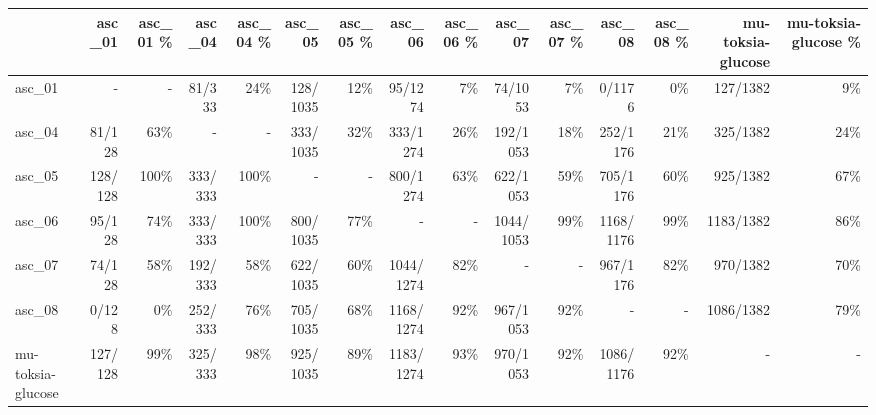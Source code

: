 \begin{tabular}{lrrrrrrrrrrrrrr}
\toprule
 & asc_01 & asc_01 \% & asc_04 & asc_04 \% & asc_05 & asc_05 \% & asc_06 & asc_06 \% & asc_07 & asc_07 \% & asc_08 & asc_08 \% & mu-toksia-glucose & mu-toksia-glucose \% \\
\midrule
asc_01 & - & - & 81/333 & 24\% & 128/1035 & 12\% & 95/1274 & 7\% & 74/1053 & 7\% & 0/1176 & 0\% & 127/1382 & 9\% \\
asc_04 & 81/128 & 63\% & - & - & 333/1035 & 32\% & 333/1274 & 26\% & 192/1053 & 18\% & 252/1176 & 21\% & 325/1382 & 24\% \\
asc_05 & 128/128 & 100\% & 333/333 & 100\% & - & - & 800/1274 & 63\% & 622/1053 & 59\% & 705/1176 & 60\% & 925/1382 & 67\% \\
asc_06 & 95/128 & 74\% & 333/333 & 100\% & 800/1035 & 77\% & - & - & 1044/1053 & 99\% & 1168/1176 & 99\% & 1183/1382 & 86\% \\
asc_07 & 74/128 & 58\% & 192/333 & 58\% & 622/1035 & 60\% & 1044/1274 & 82\% & - & - & 967/1176 & 82\% & 970/1382 & 70\% \\
asc_08 & 0/128 & 0\% & 252/333 & 76\% & 705/1035 & 68\% & 1168/1274 & 92\% & 967/1053 & 92\% & - & - & 1086/1382 & 79\% \\
mu-toksia-glucose & 127/128 & 99\% & 325/333 & 98\% & 925/1035 & 89\% & 1183/1274 & 93\% & 970/1053 & 92\% & 1086/1176 & 92\% & - & - \\
\bottomrule
\end{tabular}
